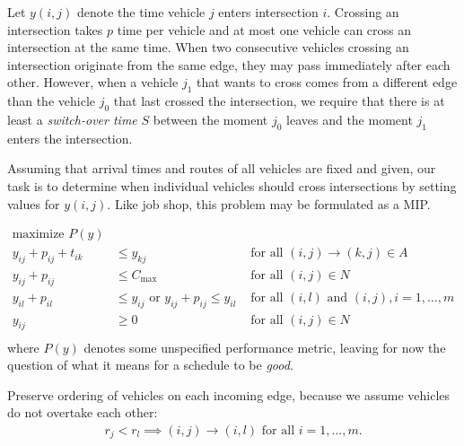 \documentclass{article}
\begin{document}
Let $y(i,j)$ denote the time vehicle $j$ enters intersection $i$. Crossing an
intersection takes $p$ time per vehicle and at most one vehicle can cross an
intersection at the same time. When two consecutive vehicles crossing an
intersection originate from the same edge, they may pass immediately after each
other. However, when a vehicle $j_{1}$ that wants to cross comes from a
different edge than the vehicle $j_{0}$ that last crossed the intersection, we
require that there is at least a \textit{switch-over time} $S$ between the
moment $j_{0}$ leaves and the moment $j_{1}$ enters the intersection.

Assuming that arrival times and routes of all vehicles are fixed and given,
our task is to determine when individual vehicles should cross intersections by
setting values for $y(i,j)$.
Like job shop, this problem may be formulated as a MIP.

\begin{align*}
  \text{maximize } P(y) \\
  y_{ij} + p_{ij} + t_{ik} &\leq y_{kj}  & \text{ for all } (i,j) \xrightarrow{} (k,j) \in A \\
  y_{ij} + p_{ij} &\leq C_{\text{max}} & \text{ for all } (i,j) \in N \\
  y_{il} + p_{il} &\leq  y_{ij} \text{ or } y_{ij} + p_{ij} \leq y_{il}  & \text{ for all } (i,l) \text{ and } (i,j), i =1, \dots,m \\
  y_{ij} &\geq 0 & \text{ for all } (i,j) \in N \\
\end{align*}
where $P(y)$ denotes some unspecified performance metric, leaving for now the
question of what it means for a schedule to be \textit{good}.

Preserve ordering of vehicles on each incoming edge, because we assume vehicles do not overtake each other:
\begin{align*}
  r_{j} < r_{l} \implies (i,j) \rightarrow{} (i,l) \text{ for all } i = 1,\dots,m .
\end{align*}
\end{document}
